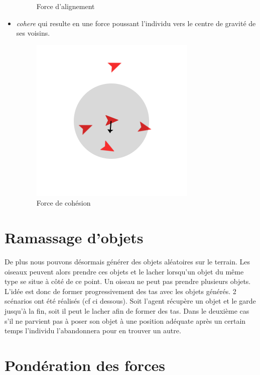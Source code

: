 \documentclass{article}
\begin{document}
\begin{itemize}
\begin{figure}[h]
\begin{center}
  		\caption{Force d'alignement}
  		\label{fig:align}
  	\end{center}
  \end{figure}
  \item \emph{cohere} qui resulte en une force poussant l'individu vers le centre de gravité de ses voisins.
  \begin{figure}[h]
  	\begin{center}
  		\includegraphics[scale=0.3]{img/cohere}
  		\caption{Force de cohésion}
  		\label{fig:cohere}
  	\end{center}
  \end{figure}
\end{itemize}

\section{Ramassage d'objets}

De plus nous pouvons désormais générer des objets aléatoires sur le terrain. Les oiseaux peuvent alors prendre ces objets et le lacher lorsqu'un objet du même type se situe à côté de ce point. Un oiseau ne peut pas prendre plusieurs objets. L'idée est donc de former progressivement des tas avec les objets générés.
2 scénarios ont été réalisés (cf ci dessous). Soit l'agent récupère un objet et le garde jusqu'à la fin, soit il peut le lacher afin de former des tas. Dans le deuxième cas s'il ne parvient pas à poser son objet à une position adéquate après un certain temps l'individu l'abandonnera pour en trouver un autre.

\section{Pondération des forces}
\end{document}
